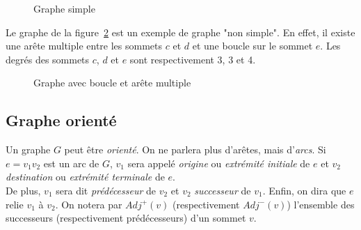 \documentclass[11pt,a4paper]{report}
\begin{document}
\begin{figure}[H]
\begin{center}
\caption{Graphe simple}\label{fig:Gsimple}
\end{center}
\end{figure}

Le graphe de la figure~\ref{fig:Gnonsimple} est un exemple de graphe "non simple". En effet, il existe une arête multiple entre les sommets $c$ et $d$ et une boucle sur le sommet $e$. Les degrés des sommets $c$, $d$ et $e$ sont respectivement 3, 3 et 4.

\begin{figure}[H]
\begin{center}
\caption{Graphe avec boucle et arête multiple}\label{fig:Gnonsimple}
\end{center}
\end{figure}

\subsection{Graphe orienté}

Un graphe $G$ peut \^etre {\em orient\'e}. On ne parlera plus d'ar\^etes,
mais d'{\em arcs}. Si $e = v_1v_2$ est un arc de $G$, $v_1$ sera appel\'e 
{\em origine} ou {\em extr\'emit\'e initiale} de $e$ et $v_2$
{\em destination} ou {\em extr\'emit\'e terminale} de $e$.\\
De plus, $v_1$ sera dit {\em pr\'ed\'ecesseur} de $v_2$ et $v_2$ {\em successeur}
de $v_1$. Enfin, on dira que $e$ relie $v_1$ à $v_2$.
On notera par $Adj^+(v)$ (respectivement $Adj^-(v)$) l'ensemble des successeurs (respectivement prédécesseurs) d'un sommet $v$.
\end{document}
